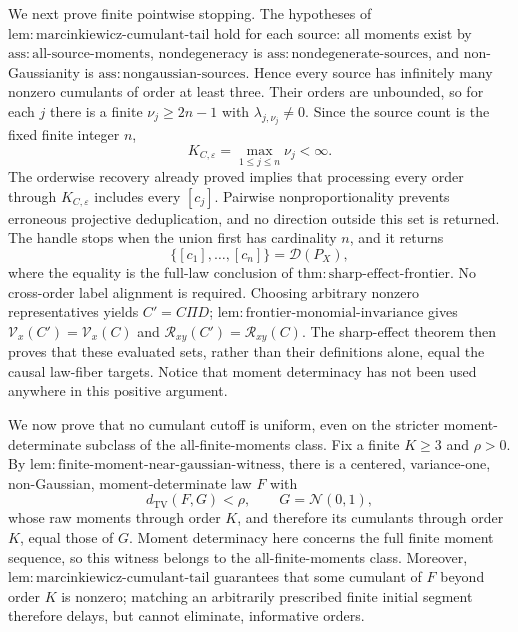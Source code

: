 We next prove finite pointwise stopping. The hypotheses of \(\mathrm{lem:marcinkiewicz\text{-}cumulant\text{-}tail}\) hold for each source: all moments exist by \(\mathrm{ass:all\text{-}source\text{-}moments}\), nondegeneracy is \(\mathrm{ass:nondegenerate\text{-}sources}\), and non-Gaussianity is \(\mathrm{ass:nongaussian\text{-}sources}\). Hence every source has infinitely many nonzero cumulants of order at least three. Their orders are unbounded, so for each \(j\) there is a finite \(\nu_j\ge2n-1\) with \(\lambda_{j,\nu_j}\ne0\). Since the source count is the fixed finite integer \(n\),
\[
 K_{C,\varepsilon}=\max_{1\le j\le n}\nu_j<\infty. \tag{27}
\]
The orderwise recovery already proved implies that processing every order through \(K_{C,\varepsilon}\) includes every \([c_j]\). Pairwise nonproportionality prevents erroneous projective deduplication, and no direction outside this set is returned. The handle stops when the union first has cardinality \(n\), and it returns
\[
 \{[c_1],\ldots,[c_n]\}=\mathcal D(P_X), \tag{28}
\]
where the equality is the full-law conclusion of \(\mathrm{thm:sharp\text{-}effect\text{-}frontier}\). No cross-order label alignment is required. Choosing arbitrary nonzero representatives yields \(C'=C\Pi D\); \(\mathrm{lem:frontier\text{-}monomial\text{-}invariance}\) gives \(\mathcal V_x(C')=\mathcal V_x(C)\) and \(\mathcal R_{xy}(C')=\mathcal R_{xy}(C)\). The sharp-effect theorem then proves that these evaluated sets, rather than their definitions alone, equal the causal law-fiber targets. Notice that moment determinacy has not been used anywhere in this positive argument.

We now prove that no cumulant cutoff is uniform, even on the stricter moment-determinate subclass of the all-finite-moments class. Fix a finite \(K\ge3\) and \(\rho>0\). By \(\mathrm{lem:finite\text{-}moment\text{-}near\text{-}gaussian\text{-}witness}\), there is a centered, variance-one, non-Gaussian, moment-determinate law \(F\) with
\[
 d_{\mathrm{TV}}(F,G)<\rho,
 \qquad G=\mathcal N(0,1), \tag{29}
\]
whose raw moments through order \(K\), and therefore its cumulants through order \(K\), equal those of \(G\). Moment determinacy here concerns the full finite moment sequence, so this witness belongs to the all-finite-moments class. Moreover, \(\mathrm{lem:marcinkiewicz\text{-}cumulant\text{-}tail}\) guarantees that some cumulant of \(F\) beyond order \(K\) is nonzero; matching an arbitrarily prescribed finite initial segment therefore delays, but cannot eliminate, informative orders.

